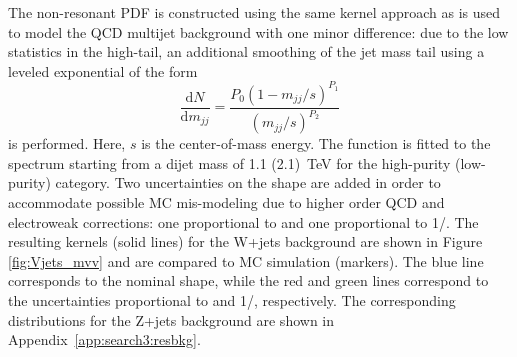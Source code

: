 The non-resonant \MVV PDF is constructed using the same kernel approach as is used to model the QCD multijet background with one minor difference: due to the low statistics in the high-\MVV tail, an additional smoothing of the jet mass tail using a leveled exponential of the form
\begin{equation}
\frac{\text{d} N}{\text{d} m_{jj}} = \frac{P_0 (1-m_{jj}/s)^{P_1}}{(m_{jj}/s)^{P_2}}
\end{equation}
is performed. Here, $s$ is the center-of-mass energy. The function is fitted to the spectrum starting from a dijet mass of 1.1 (2.1)~TeV for the high-purity (low-purity) category. Two uncertainties on the shape are added in order to accommodate possible MC mis-modeling due to higher order QCD and electroweak corrections: one proportional to \MVV and one proportional to 1/\MVV. The resulting \MVV kernels (solid lines) for the W+jets background are shown in Figure \ref{fig:Vjets_mvv} and are compared to MC simulation (markers). The blue line corresponds to the nominal shape, while the red and green lines correspond to the uncertainties proportional to \MVV and 1/\MVV, respectively. The corresponding distributions for the Z+jets background are shown in Appendix~\ref{app:search3:resbkg}.\par
